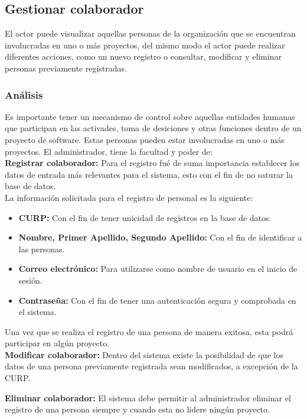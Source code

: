\subsection{Gestionar colaborador}
El actor puede visualizar aquellas personas de la organización que se encuentran involucradas en uno o más proyectos, del  mismo modo el actor puede realizar diferentes acciones, como un nuevo registro o consultar, modificar y eliminar personas previamente registradas.

\subsubsection {Análisis}
Es importante tener un mecanismo de control sobre aquellas entidades humanas que participan en las activades, toma de desiciones y otras funciones dentro de un proyecto de software. Estas personas pueden estar involucradas en uno o más proyectos.
\bigskip
El administrador, tiene la facultad y poder de:\\

\textbf {Registrar colaborador:} Para el registro fué de suma importancia establecer los datos de entrada más relevantes para el sistema, esto con el fin de no saturar la base de datos.\\

La información solicitada para el registro de personal es la siguiente:

\begin{itemize}
	\item \textbf{CURP:} Con el fin de tener unicidad de registros en la base de datos.
	\item \textbf{Nombre, Primer Apellido, Segundo Apellido:} Con el fin de identificar a las personas.
	\item \textbf{Correo electrónico:} Para utilizarse como nombre de usuario en el inicio de sesión.
	\item \textbf{Contraseña:} Con el fin de tener una autenticación segura y comprobada en el sistema.
\end{itemize}

Una vez que se realiza el registro de una persona de manera exitosa, esta podrá participar en algún proyecto.\\

\textbf {Modificar colaborador:} Dentro del sistema existe la posibilidad de que los datos de una persona previamente registrada sean modificados, a excepción de la CURP.

\textbf {Eliminar colaborador:} El sistema debe permitir al administrador eliminar el registro de una persona siempre y cuando esta no lidere ningún proyecto.

